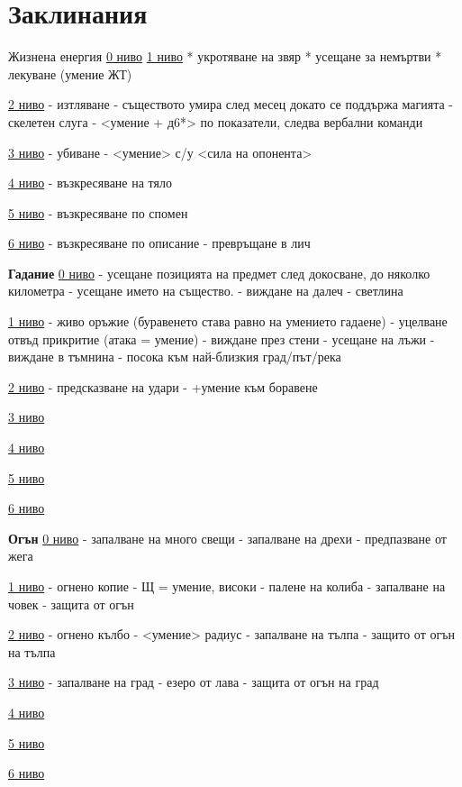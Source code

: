 \section{Заклинания} 



Жизнена енергия 
\underline{0 ниво} 
\underline{1 ниво}
* укротяване на звяр
* усещане за немъртви
* лекуване (умение ЖТ)

\underline{2 ниво}
- изтляване - съществото умира след месец  докато се поддържа магията
- скелетен слуга - <умение + д6*> по показатели, следва вербални команди

\underline{3 ниво}
- убиване - <умение> с/у <сила на опонента>

\underline{4 ниво}
- възкресяване на тяло

\underline{5 ниво}
- възкресяване по спомен

\underline{6 ниво}
- възкресяване по описание
- превръщане в лич

\textbf{Гадание}
\underline{0 ниво}
- усещане позицията на предмет след докосване, до няколко километра
- усещане името на същество.
- виждане на далеч
- светлина

\underline{1 ниво}
- живо оръжие (буравенето става равно на умението гадаене)
- уцелване отвъд прикритие (атака = умение)
- виждане през стени
- усещане на лъжи
- виждане в тъмнина
- посока към най-близкия град/път/река

\underline{2 ниво}
- предсказване на удари - +умение към боравене

\underline{3 ниво}

\underline{4 ниво}

\underline{5 ниво}

\underline{6 ниво}



\textbf{Огън}
\underline{0 ниво}
- запалване на много свещи
- запалване на дрехи
- предпазване от жега

\underline{1 ниво}
- огнено копие - Щ = умение, високи
- палене на колиба
- запалване на човек
- защита от огън

\underline{2 ниво}
- огнено кълбо - <умение> радиус
- запалване на тълпа
- защито от огън на тълпа

\underline{3 ниво}
- запалване на град
- езеро от лава
- защита от огън на град

\underline{4 ниво}

\underline{5 ниво}

\underline{6 ниво}








